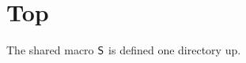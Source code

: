 \documentclass{article}
\begin{document}
\section{Top}
The shared macro $\mathsf{S}$ is defined one directory up.



\end{document}
